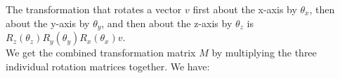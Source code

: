 \documentclass[13pt]{letter}
\begin{document}
\begin{enumerate}
	The transformation that rotates a vector $v$ first about the x-axis by $\theta_x$, then about the y-axis by $\theta_y$, and then about the z-axis by $\theta_z$ is $R_z(\theta_z)R_y(\theta_y)R_x(\theta_x)v$. \\
	We get the combined transformation matrix $M$ by multiplying the three individual rotation matrices together. We have:
\end{enumerate}
\end{document}
